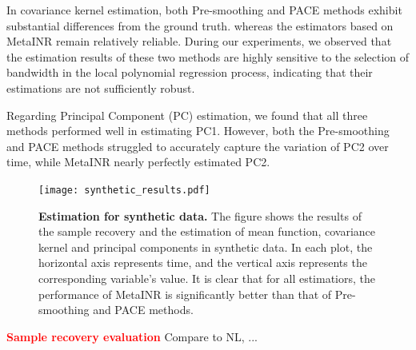 \documentclass{article}
\begin{document}
In covariance kernel estimation, both Pre-smoothing and PACE methods exhibit substantial differences from the ground truth. 
whereas the estimators based on MetaINR remain relatively reliable.
During our experiments, we observed that the estimation results of these two methods are highly sensitive to the selection of bandwidth in the local polynomial regression process, 
indicating that their estimations are not sufficiently robust.

Regarding Principal Component (PC) estimation, we found that all three methods performed well in estimating PC1. 
However, both the Pre-smoothing and PACE methods struggled to accurately capture the variation of PC2 over time, while MetaINR nearly perfectly estimated PC2.

\begin{figure}[htb]
  \centering
  \texttt{[image: synthetic\_results.pdf]}
  \caption{\textbf{Estimation for synthetic data.} The figure shows the results of the sample recovery and the estimation of mean function, covariance kernel and principal components in synthetic data. 
  In each plot, the horizontal axis represents time, and the vertical axis represents the corresponding variable's value. 
  It is clear that for all estimatiors, the performance of MetaINR is significantly better than that of Pre-smoothing and PACE methods. }
  \label{Estimation for synthetic data}
\end{figure}

\textcolor{red}{
\textbf{Sample recovery evaluation}
}
Compare to NL, ...




\end{document}
